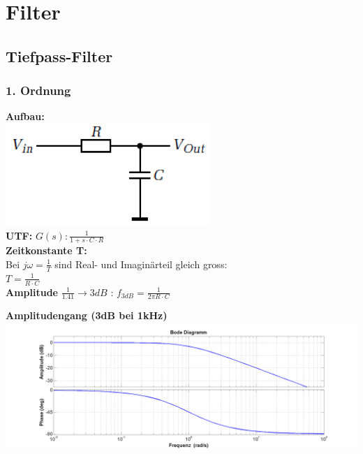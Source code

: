 \section{Filter}
\subsection{Tiefpass-Filter}

\subsubsection{1. Ordnung}
\begin{multicols}{2}
	\textbf{Aufbau:} \\
	\includegraphics[scale=0.4]{pictures/tiefpass1ordnung} \\
	\textbf{UTF: } $G(s): \frac{1}{1+s\cdot C\cdot R}$ \\
	\textbf{Zeitkonstante T:} \\
	Bei $j\omega=\frac{1}{T}$ sind Real-  und Imaginärteil gleich gross:  \\
	$T=\frac{1}{R \cdot C}$ \\
	\textbf{Amplitude} $\frac{1}{1.41}\to 3dB$ : $f_{3dB}=\frac{1}{2\pi R\cdot C}$ \\	
\end{multicols}

\textbf{Amplitudengang (3dB bei 1kHz)}\\
\includegraphics[scale=0.5]{./pictures/TP1BodePlot.png}



